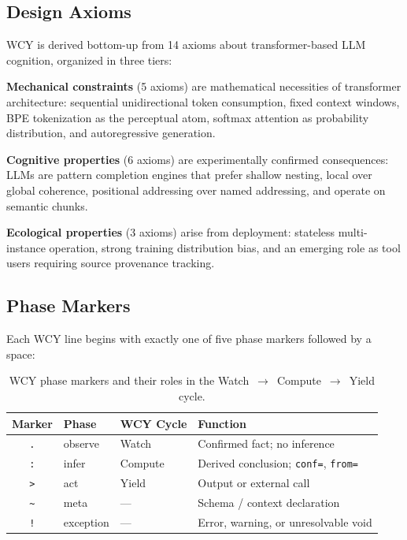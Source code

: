 \documentclass[11pt,a4paper]{article}
\begin{document}
\subsection{Design Axioms}

WCY is derived bottom-up from 14 axioms about transformer-based LLM cognition, organized in three tiers:

\textbf{Mechanical constraints} (5 axioms) are mathematical necessities of transformer architecture: sequential unidirectional token consumption, fixed context windows, BPE tokenization as the perceptual atom, softmax attention as probability distribution, and autoregressive generation.

\textbf{Cognitive properties} (6 axioms) are experimentally confirmed consequences: LLMs are pattern completion engines that prefer shallow nesting, local over global coherence, positional addressing over named addressing, and operate on semantic chunks.

\textbf{Ecological properties} (3 axioms) arise from deployment: stateless multi-instance operation, strong training distribution bias, and an emerging role as tool users requiring source provenance tracking.

\subsection{Phase Markers}

Each WCY line begins with exactly one of five phase markers followed by a space:

\begin{table}[H]
\centering
\small
\begin{tabular}{@{}clll@{}}
\toprule
\textbf{Marker} & \textbf{Phase} & \textbf{WCY Cycle} & \textbf{Function} \\
\midrule
\texttt{.} & observe & Watch   & Confirmed fact; no inference \\
\texttt{:} & infer   & Compute & Derived conclusion; \texttt{conf=}, \texttt{from=} \\
\texttt{>} & act     & Yield   & Output or external call \\
\texttt{\textasciitilde} & meta & --- & Schema / context declaration \\
\texttt{!} & exception & --- & Error, warning, or unresolvable void \\
\bottomrule
\end{tabular}
\caption{WCY phase markers and their roles in the Watch~$\to$~Compute~$\to$~Yield cycle.}
\label{tab:markers}
\end{table}
\end{document}

